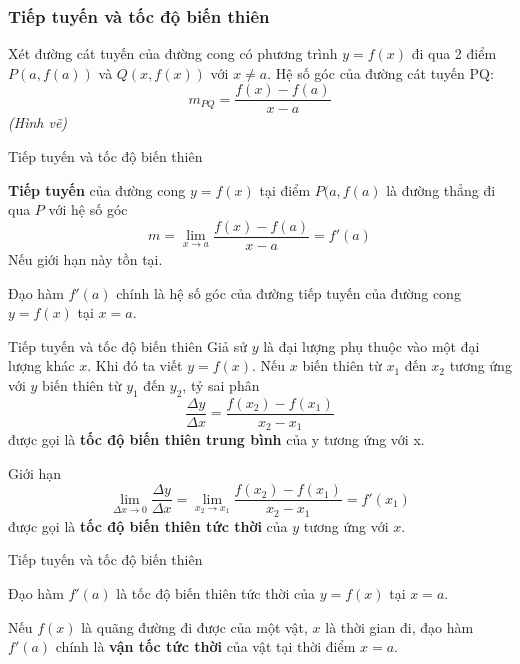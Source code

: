 \begin{frame}
    \frametitle{Tiếp tuyến và tốc độ biến thiên}
  Xét đường cát tuyến của đường cong có phương trình $y=f(x)$ đi qua 2 điểm $P(a, f(a))$ và $Q(x, f(x))$ với $x\neq a$. Hệ số góc của đường cát tuyến PQ:
  \begin{equation}
      m_{PQ}=\dfrac{f(x)-f(a)}{x-a}
  \end{equation}
  \textit{(Hình vẽ)}
  \end{frame}
  \begin{frame}
  {Tiếp tuyến và tốc độ biến thiên}
  \begin{tcolorbox}[colback=blue!10, colframe=blue!50!black, title=Định nghĩa]
  \textbf{Tiếp tuyến} của đường cong $y=f(x)$ tại điểm $P(a, f(a)$ là đường thẳng đi qua $P$ với hệ số góc
  \begin{equation}
      m=\lim_{x\rightarrow a}\dfrac{f(x)-f(a)}{x-a}=f'(a)
  \end{equation}
  Nếu giới hạn này tồn tại.
  \end{tcolorbox}
  \begin{tcolorbox}[colback=blue!10, colframe=blue!50!black, title= ]
  Đạo hàm $f'(a)$ chính là hệ số góc của đường tiếp tuyến của đường cong $y=f(x)$ tại $x=a$.
  \end{tcolorbox}
    \end{frame}
  \begin{frame}{Tiếp tuyến và tốc độ biến thiên}
      Giả sử $y$ là đại lượng phụ thuộc vào một đại lượng khác $x$. Khi đó ta viết $y=f(x)$. Nếu $x$ biến thiên từ $x_1$ đến $x_2$ tương ứng với $y$ biến thiên từ $y_1$ đến $y_2$, tỷ sai phân
      \begin{equation}
          \dfrac{\Delta y}{\Delta x}=\dfrac{f(x_2)-f(x_1)}{x_2-x_1}
      \end{equation}
      được gọi là \textbf{tốc độ biến thiên trung bình} của y tương ứng với x.
  
      \begin{tcolorbox}[colback=blue!10, colframe=blue!50!black, title= ]
      Giới hạn
      \begin{equation}
          \lim_{\Delta x \rightarrow 0}\dfrac{\Delta y}{\Delta x}=\lim_{x_2 \rightarrow x_1}\dfrac{f(x_2)-f(x_1)}{x_2-x_1}=f'(x_1)
      \end{equation}
      được gọi là \textbf{tốc độ biến thiên tức thời} của $y$ tương ứng với $x$.
      \end{tcolorbox}
  \end{frame}
  \begin{frame}{Tiếp tuyến và tốc độ biến thiên}
      \begin{tcolorbox}[colback=blue!10, colframe=blue!50!black, title= ]
      Đạo hàm $f'(a)$ là tốc độ biến thiên tức thời của $y=f(x)$ tại $x=a$.
      \end{tcolorbox}
      Nếu $f(x)$ là quãng đường đi được của một vật, $x$ là thời gian đi, đạo hàm $f'(a)$ chính là \textbf{vận tốc tức thời} của vật tại thời điểm $x=a$.
  \end{frame}
  